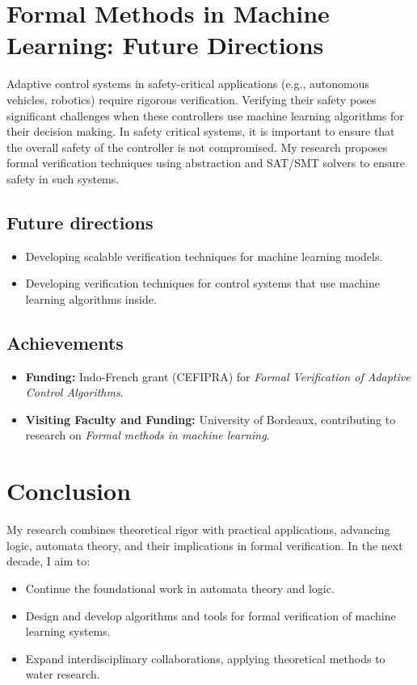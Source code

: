 \documentclass[11pt,a4paper,sans]{moderncv} %
\begin{document}
\section{Formal Methods in Machine Learning: Future Directions}
Adaptive control systems in safety-critical applications (e.g., autonomous vehicles, robotics) require rigorous verification. Verifying their safety poses significant challenges when these controllers use machine learning algorithms for their decision making. In safety critical systems, it is important
to ensure that the overall safety of the controller is not compromised. My research proposes formal verification techniques using abstraction and SAT/SMT solvers to ensure safety in such systems.

\subsection{Future directions}
\begin{itemize}
 \item Developing scalable verification techniques for machine learning models.
 \item Developing verification techniques for control systems that use machine learning algorithms inside.
\end{itemize}

\subsection{Achievements}
\begin{itemize}
    \item \textbf{Funding:} Indo-French grant (CEFIPRA) for \emph{Formal Verification of Adaptive Control Algorithms}.
    \item \textbf{Visiting Faculty and Funding:} University of Bordeaux, contributing to research on \emph{Formal methods in machine learning}.
\end{itemize}


\section{Conclusion}
My research combines theoretical rigor with practical applications, advancing logic, automata theory, and their implications in formal verification. In the next decade, I aim to:
\begin{itemize}
    \item Continue the foundational work in automata theory and logic.
    \item Design and develop algorithms and tools for formal verification of machine learning systems.
    \item Expand interdisciplinary collaborations, applying theoretical methods to water research.
\end{itemize}




\end{document}
